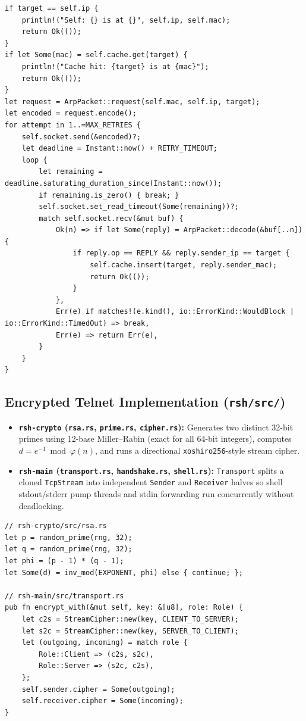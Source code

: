 \documentclass[11pt,a4paper]{article}
\begin{document}
\begin{lstlisting}[caption={Self-lookup, cache check, and bounded UDP retry loop in \texttt{arp/src/client.rs}.}]
if target == self.ip {
    println!("Self: {} is at {}", self.ip, self.mac);
    return Ok(());
}
if let Some(mac) = self.cache.get(target) {
    println!("Cache hit: {target} is at {mac}");
    return Ok(());
}
let request = ArpPacket::request(self.mac, self.ip, target);
let encoded = request.encode();
for attempt in 1..=MAX_RETRIES {
    self.socket.send(&encoded)?;
    let deadline = Instant::now() + RETRY_TIMEOUT;
    loop {
        let remaining = deadline.saturating_duration_since(Instant::now());
        if remaining.is_zero() { break; }
        self.socket.set_read_timeout(Some(remaining))?;
        match self.socket.recv(&mut buf) {
            Ok(n) => if let Some(reply) = ArpPacket::decode(&buf[..n]) {
                if reply.op == REPLY && reply.sender_ip == target {
                    self.cache.insert(target, reply.sender_mac);
                    return Ok(());
                }
            },
            Err(e) if matches!(e.kind(), io::ErrorKind::WouldBlock | io::ErrorKind::TimedOut) => break,
            Err(e) => return Err(e),
        }
    }
}
\end{lstlisting}

\subsection{Encrypted Telnet Implementation (\texttt{rsh/src/})}
\begin{itemize}
  \item \textbf{\texttt{rsh-crypto} (\texttt{rsa.rs}, \texttt{prime.rs}, \texttt{cipher.rs}):} Generates two distinct 32-bit primes using 12-base Miller--Rabin (exact for all 64-bit integers), computes $d = e^{-1} \bmod \varphi(n)$, and runs a directional \texttt{xoshiro256}-style stream cipher.
  \item \textbf{\texttt{rsh-main} (\texttt{transport.rs}, \texttt{handshake.rs}, \texttt{shell.rs}):} \texttt{Transport} splits a cloned \texttt{TcpStream} into independent \texttt{Sender} and \texttt{Receiver} halves so shell stdout/stderr pump threads and stdin forwarding run concurrently without deadlocking.
\end{itemize}

\begin{lstlisting}[caption={Key generation (\texttt{rsa.rs}) and directional cipher setup (\texttt{transport.rs}).}]
// rsh-crypto/src/rsa.rs
let p = random_prime(rng, 32);
let q = random_prime(rng, 32);
let phi = (p - 1) * (q - 1);
let Some(d) = inv_mod(EXPONENT, phi) else { continue; };

// rsh-main/src/transport.rs
pub fn encrypt_with(&mut self, key: &[u8], role: Role) {
    let c2s = StreamCipher::new(key, CLIENT_TO_SERVER);
    let s2c = StreamCipher::new(key, SERVER_TO_CLIENT);
    let (outgoing, incoming) = match role {
        Role::Client => (c2s, s2c),
        Role::Server => (s2c, c2s),
    };
    self.sender.cipher = Some(outgoing);
    self.receiver.cipher = Some(incoming);
}
\end{lstlisting}
\end{document}
